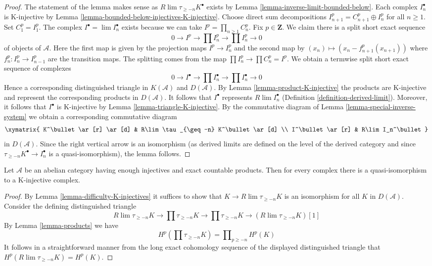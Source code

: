 \begin{proof}
The statement of the lemma makes sense as $R\lim \tau_{\geq -n}K^\bullet$
exists by Lemma \ref{lemma-inverse-limit-bounded-below}.
Each complex $I_n^\bullet$ is K-injective by
Lemma \ref{lemma-bounded-below-injectives-K-injective}.
Choose direct sum decompositions $I_{n + 1}^p = C_{n + 1}^p \oplus I_n^p$
for all $n \geq 1$. Set $C_1^p = I_1^p$. The complex
$I^\bullet = \lim I_n^\bullet$ exists because we can take
$I^p = \prod_{n \geq 1} C_n^p$. Fix $p \in \mathbf{Z}$.
We claim there is a split short exact sequence
$$
0 \to I^p \to \prod I_n^p \to \prod I_n^p \to 0
$$
of objects of $\mathcal{A}$. Here the first map is given by
the projection maps $I^p \to I_n^p$ and the second map
by $(x_n) \mapsto (x_n - f^p_{n + 1}(x_{n + 1}))$ where
$f^p_n : I_n^p \to I_{n - 1}^p$ are the transition maps.
The splitting comes from the map $\prod I_n^p \to \prod C_n^p = I^p$.
We obtain a termwise split short exact sequence of complexes
$$
0 \to I^\bullet \to \prod I_n^\bullet \to \prod I_n^\bullet \to 0
$$
Hence a corresponding distinguished triangle in $K(\mathcal{A})$
and $D(\mathcal{A})$. By Lemma \ref{lemma-product-K-injective}
the products are K-injective and represent the corresponding
products in $D(\mathcal{A})$.
It follows that $I^\bullet$ represents $R\lim I_n^\bullet$
(Definition \ref{definition-derived-limit}).
Moreover, it follows that $I^\bullet$ is K-injective by
Lemma \ref{lemma-triangle-K-injective}.
By the commutative diagram of Lemma \ref{lemma-special-inverse-system}
we obtain a corresponding commutative diagram
$$
\xymatrix{
K^\bullet \ar[r] \ar[d] & R\lim \tau_{\geq -n} K^\bullet \ar[d] \\
I^\bullet \ar[r] & R\lim I_n^\bullet
}
$$
in $D(\mathcal{A})$. Since the right vertical arrow is an isomorphism
(as derived limits are defined on the level of the derived category
and since $\tau_{\geq -n}K^\bullet \to I_n^\bullet$ is a quasi-isomorphism),
the lemma follows.
\end{proof}

\begin{lemma}
\label{lemma-enough-K-injectives-Ab4-star}
Let $\mathcal{A}$ be an abelian category having enough injectives
and exact countable products. Then for every complex
there is a quasi-isomorphism to a K-injective complex.
\end{lemma}

\begin{proof}
By Lemma \ref{lemma-difficulty-K-injectives} it suffices to show that
$K \to R\lim\tau_{\geq -n}K$ is an isomorphism for all $K$ in $D(\mathcal{A})$.
Consider the defining distinguished triangle
$$
R\lim\tau_{\geq -n}K \to
\prod \tau_{\geq -n}K \to
\prod \tau_{\geq -n}K \to
(R\lim\tau_{\geq -n}K)[1]
$$
By Lemma \ref{lemma-products} we have
$$
H^p(\prod \tau_{\geq -n}K) = \prod\nolimits_{p \geq -n} H^p(K)
$$
It follows in a straightforward manner from the long exact cohomology
sequence of the displayed distinguished triangle
that $H^p(R\lim \tau_{\geq -n}K) = H^p(K)$.
\end{proof}









